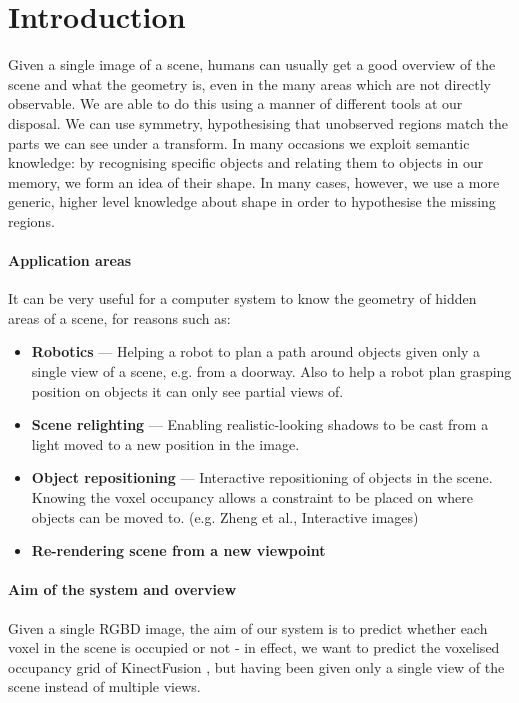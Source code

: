 \documentclass[10pt,a4paper, twocolumn]{article}
\makeatletter
\newcommand*{\eg}{e.g.\@\xspace}
\newcommand*{\ea}{et al.\@\xspace}
\makeatother
\begin{document}

\section{Introduction}
Given a single image of a scene, humans can usually get a good overview of the scene and what the geometry is, even in the many areas which are not directly observable. 
We are able to do this using a manner of different tools at our disposal. 
We can use symmetry, hypothesising that unobserved regions match the parts we can see under a transform.
In many occasions we exploit semantic knowledge: by recognising specific objects and relating them to objects in our memory, we form an idea of their shape.
In many cases, however, we use a more generic, higher level knowledge about shape in order to hypothesise the missing regions.



\paragraph{Application areas}
It can be very useful for a computer system to know the geometry of hidden areas of a scene, for reasons such as:

\begin{itemize}
\item \textbf{Robotics} --- Helping a robot to plan a path around objects given only a single view of a scene, e.g. from a doorway. Also to help a robot plan grasping position on objects it can only see partial views of.
\item \textbf{Scene relighting} --- Enabling realistic-looking shadows to be cast from a light moved to a new position in the image.
\item \textbf{Object repositioning} --- Interactive repositioning of objects in the scene. Knowing the voxel occupancy allows a constraint to be placed on where objects can be moved to. (\eg Zheng \ea, Interactive images)
\item \textbf{Re-rendering scene from a new viewpoint}
\end{itemize}

\paragraph{Aim of the system and overview}
Given a single RGBD image, the aim of our system is to predict whether each voxel in the scene is occupied or not - in effect, we want to predict the voxelised occupancy grid of KinectFusion \cite{izadi-uist-2011}, but having been given only a single view of the scene instead of multiple views.
\end{document}
